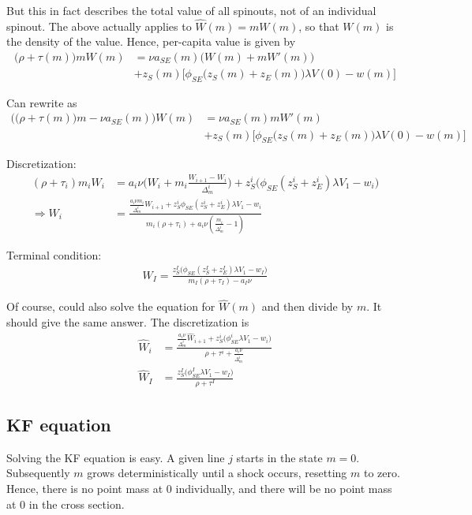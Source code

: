 \documentclass[12pt,english]{article}
\theoremstyle{remark}
\begin{document}
But this in fact describes the total value of all spinouts, not of an individual spinout. The above actually applies to $\hat{W}(m) = mW(m)$, so that $W(m)$ is the density of the value. Hence, per-capita value is given by 
\begin{align*}
		\big(\rho + \tau(m)\big)mW(m) &= \nu a_{SE}(m) \big(W(m) + mW'(m)\big)  \\
	&+ z_S(m) \Big[ \phi_{SE}\big(z_S(m) + z_E(m)\big) \lambda V(0) - w(m) \Big] 
\end{align*}

Can rewrite as
\begin{align*}
		\Big(\big(\rho + \tau(m)  \big)m -  \nu a_{SE}(m) \Big)W(m) &= \nu a_{SE}(m) mW'(m)\\
	&+ z_S(m) \Big[ \phi_{SE}\big(z_S(m) + z_E(m)\big) \lambda V(0) - w(m) \Big] 
\end{align*}

Discretization:
\begin{align*}
	(\rho + \tau_i)m_i W_i &= a_i \nu \big(W_i + m_i \frac{W_{i+1} - W_i}{\Delta_m^i}\big) + z_S^i \big(\phi_{SE}(z_S^i + z_E^i) \lambda V_1 - w_i \big) \\
	\Rightarrow W_i &= \frac{\frac{a_i \nu m_i}{\Delta_m^i}W_{i+1} + z_S^i \phi_{SE}(z_S^i + z_E^i)\lambda V_1 - w_i}{m_i(\rho+ \tau_i) + a_i \nu (\frac{m_i}{\Delta_m^i} - 1)} 
\end{align*}

Terminal condition:
\begin{align*}
	W_I = \frac{z_S^I \big (\phi_{SE} (z_S^I + z_E^I) \lambda V_1 - w_I \big)}{m_I(\rho + \tau_I) - a_I \nu }
\end{align*}

Of course, could also solve the equation for $\hat{W}(m)$ and then divide by $m$. It should give the same answer. The discretization is 
\begin{align*}
	\hat{W}_i &= \frac{\frac{a_i \nu}{\Delta_m^i} \hat{W}_{i+1} + z_S^i \big( \phi_{SE}^i \lambda V_1 - w_i \big)}{\rho + \tau^i + \frac{a_i \nu}{\Delta_m^i}} \\
	\hat{W}_I &= \frac{z_S^I \big( \phi_{SE}^I \lambda V_1 - w_I \big)}{\rho + \tau^I}
\end{align*}


\subsection{KF equation}

Solving the KF equation is easy. A given line $j$ starts in the state $m = 0$. Subsequently $m$ grows deterministically until a shock occurs, resetting $m$ to zero. Hence, there is no point mass at 0 individually, and there will be no point mass at 0 in the cross section. 
\end{document}

